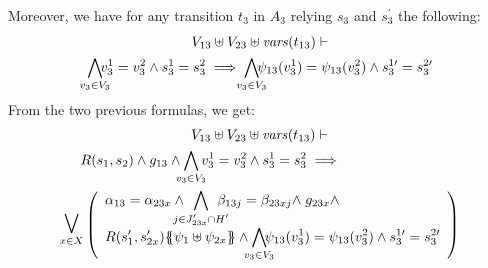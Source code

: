 \documentclass[runningheads]{llncs}
\begin{document}
\begin{enumerate}
Moreover, we have  for any transition $t_3$ in $A_3$ relying $s_3$ and $s^{\prime}_3$ the following:
\begin{multline*}
V_{13} \uplus V_{23}  \uplus \fvars{t_{13}} \vdash\\
\bigwedge_\subbox{v_3\in V_3}\!\! v^1_3=v^2_3  \wedge s^1_3 = s^2_3 \implies \bigwedge_\subbox{v_3\in V_3}\!\! \psi_{13}(v^1_3)=\psi_{13}(v^2_3)  \wedge s^{1\prime}_3 = s^{2\prime}_3 
 \end{multline*}	
From the two previous formulas, we get:
\begin{multline*}
V_{13} \uplus V_{23} \uplus \fvars{t_{13}}  \vdash\\
R\mpar{s_1, s_{2}} \wedge g_{13}  \land \bigwedge_\subbox{v_3\in V_3} v^1_3=v^2_3 \wedge s^1_3 = s^2_3
\implies \hspace{7em} \\ \operatorname*{\bigsymb{\bigvee}}_{x \in X} \mpar{\everymath{\displaystyle}
\begin{array}{l}
			\alpha_{13} = \alpha_{23x} \wedge \bigwedge_\subbox{j \in J'_{23x} \cap H'} \beta_{13j} = \beta_{23xj} \nwedge g_{23x}\land\\
			  R\mpar{s'_1, s'_{2x}}\psubst{\psi_1 \uplus \psi_{2x}} \wedge
 \bigwedge_\subbox{v_3\in V_3}\!\! \psi_{13}(v^1_3)=\psi_{13}(v^2_3) \wedge s^{1\prime}_3 = s^{2\prime}_3
		\end{array}}   
\end{multline*}

\end{enumerate}
\end{document}
